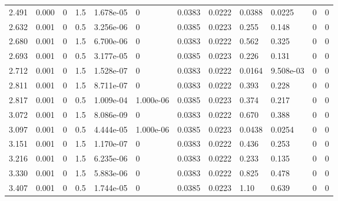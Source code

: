 \documentclass[preview]{standalone}
\begin{document}
{{\begin{tabular}{L{1.2cm}C{1.2cm} C{0.3cm}C{0.5cm} C{1.4cm}C{1.4cm} C{1.4cm}C{1.4cm} C{1.6cm}C{1.6cm} C{1.6cm}C{1.6cm}}
  2.491  &  0.000  & 0     & 1.5 &  1.678e-05  & 0  &  0.0383&   0.0222& 0.0388 & 0.0225   &  0 & 0  \\ 
  2.632  &  0.001  & 0     & 0.5 &  3.256e-06  & 0  &  0.0385&   0.0223& 0.255 & 0.148   &  0 & 0  \\ 
  2.680  &  0.001  & 0     & 1.5 &  6.700e-06  & 0  &  0.0383&   0.0222& 0.562 & 0.325   &  0 & 0  \\ 
  2.693  &  0.001  & 0     & 0.5 &  3.177e-05  & 0  &  0.0385&   0.0223& 0.226 & 0.131   &  0 & 0  \\ 
  2.712  &  0.001  & 0     & 1.5 &  1.528e-07  & 0  &  0.0383&   0.0222& 0.0164 & 9.508e-03   &  0 & 0  \\ 
  2.811  &  0.001  & 0     & 1.5 &  8.711e-07  & 0  &  0.0383&   0.0222& 0.393 & 0.228   &  0 & 0  \\ 
  2.817  &  0.001  & 0     & 0.5 &  1.009e-04  & 1.000e-06  &  0.0385&   0.0223& 0.374 & 0.217   &  0 & 0  \\ 
  3.072  &  0.001  & 0     & 1.5 &  8.086e-09  & 0  &  0.0383&   0.0222& 0.670 & 0.388   &  0 & 0  \\ 
  3.097  &  0.001  & 0     & 0.5 &  4.444e-05  & 1.000e-06  &  0.0385&   0.0223& 0.0438 & 0.0254   &  0 & 0  \\ 
  3.151  &  0.001  & 0     & 1.5 &  1.170e-07  & 0  &  0.0383&   0.0222& 0.436 & 0.253   &  0 & 0  \\ 
  3.216  &  0.001  & 0     & 1.5 &  6.235e-06  & 0  &  0.0383&   0.0222& 0.233 & 0.135   &  0 & 0  \\ 
  3.330  &  0.001  & 0     & 1.5 &  5.883e-06  & 0  &  0.0383&   0.0222& 0.825 & 0.478   &  0 & 0  \\ 
  3.407  &  0.001  & 0     & 0.5 &  1.744e-05  & 0  &  0.0385&   0.0223& 1.10 & 0.639   &  0 & 0  \\ 
\hline 
\end{tabular} 

}}
\end{document}
